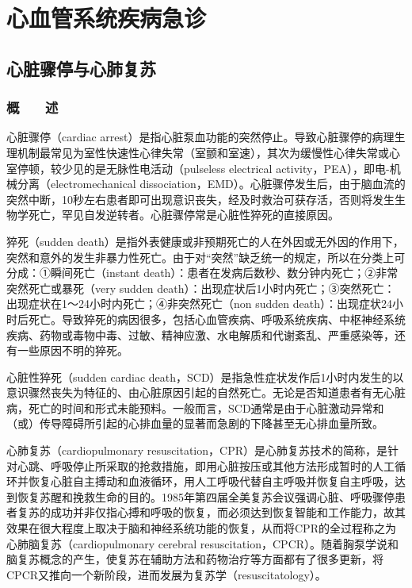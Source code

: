\part{心血管系统疾病急诊}

\chapter{心脏骤停与心肺复苏}

\section{概　　述}

心脏骤停（cardiac
arrest）是指心脏泵血功能的突然停止。导致心脏骤停的病理生理机制最常见为室性快速性心律失常（室颤和室速），其次为缓慢性心律失常或心室停顿，较少见的是无脉性电活动（pulseless
electrical activity，PEA），即电-机械分离（electromechanical
dissociation，EMD）。心脏骤停发生后，由于脑血流的突然中断，10秒左右患者即可出现意识丧失，经及时救治可获存活，否则将发生生物学死亡，罕见自发逆转者。心脏骤停常是心脏性猝死的直接原因。

猝死（sudden
death）是指外表健康或非预期死亡的人在外因或无外因的作用下，突然和意外的发生非暴力性死亡。由于对“突然”缺乏统一的规定，所以在分类上可分成：①瞬间死亡（instant
death）：患者在发病后数秒、数分钟内死亡；②非常突然死亡或暴死（very
sudden
death）：出现症状后1小时内死亡；③突然死亡：出现症状在1～24小时内死亡；④非突然死亡（non
sudden
death）：出现症状24小时后死亡。导致猝死的病因很多，包括心血管疾病、呼吸系统疾病、中枢神经系统疾病、药物或毒物中毒、过敏、精神应激、水电解质和代谢紊乱、严重感染等，还有一些原因不明的猝死。

心脏性猝死（sudden cardiac
death，SCD）是指急性症状发作后1小时内发生的以意识骤然丧失为特征的、由心脏原因引起的自然死亡。无论是否知道患者有无心脏病，死亡的时间和形式未能预料。一般而言，SCD通常是由于心脏激动异常和（或）传导障碍所引起的心排血量的显著而急剧的下降甚至无心排血量所致。

心肺复苏（cardiopulmonary
resuscitation，CPR）是心肺复苏技术的简称，是针对心跳、呼吸停止所采取的抢救措施，即用心脏按压或其他方法形成暂时的人工循环并恢复心脏自主搏动和血液循环，用人工呼吸代替自主呼吸并恢复自主呼吸，达到恢复苏醒和挽救生命的目的。1985年第四届全美复苏会议强调心脏、呼吸骤停患者复苏的成功并非仅指心搏和呼吸的恢复，而必须达到恢复智能和工作能力，故其效果在很大程度上取决于脑和神经系统功能的恢复，从而将CPR的全过程称之为心肺脑复苏（cardiopulmonary
cerebral
resuscitation，CPCR）。随着胸泵学说和脑复苏概念的产生，使复苏在辅助方法和药物治疗等方面都有了很多更新，将CPCR又推向一个新阶段，进而发展为复苏学（resuscitatology）。

